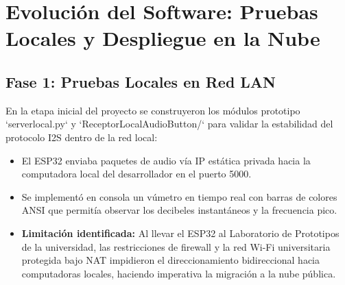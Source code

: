 \documentclass{article}
\begin{document}
\section{Evolución del Software: Pruebas Locales y Despliegue en la Nube}

\subsection{Fase 1: Pruebas Locales en Red LAN}
En la etapa inicial del proyecto se construyeron los módulos prototipo `serverlocal.py` y `ReceptorLocalAudioButton/` para validar la estabilidad del protocolo I2S dentro de la red local:
\begin{itemize}
    \item El ESP32 enviaba paquetes de audio vía IP estática privada hacia la computadora local del desarrollador en el puerto 5000.
    \item Se implementó en consola un vúmetro en tiempo real con barras de colores ANSI que permitía observar los decibeles instantáneos y la frecuencia pico.
    \item \textbf{Limitación identificada:} Al llevar el ESP32 al Laboratorio de Prototipos de la universidad, las restricciones de firewall y la red Wi-Fi universitaria protegida bajo NAT impidieron el direccionamiento bidireccional hacia computadoras locales, haciendo imperativa la migración a la nube pública.
\end{itemize}
\end{document}
